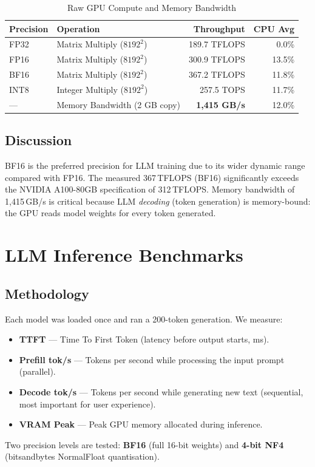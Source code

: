 \documentclass[11pt,a4paper]{article}
\begin{document}
\begin{table}[h!]
\centering
\caption{Raw GPU Compute and Memory Bandwidth}
\label{tab:raw}
\begin{tabular}{llrr}
\toprule
\textbf{Precision} & \textbf{Operation} & \textbf{Throughput} & \textbf{CPU Avg} \\
\midrule
FP32  & Matrix Multiply ($8192^2$) & 189.7 TFLOPS & 0.0\% \\
FP16  & Matrix Multiply ($8192^2$) & 300.9 TFLOPS & 13.5\% \\
BF16  & Matrix Multiply ($8192^2$) & 367.2 TFLOPS & 11.8\% \\
INT8  & Integer Multiply ($8192^2$) & 257.5 TOPS  & 11.7\% \\
\midrule
---   & Memory Bandwidth (2 GB copy) & \textbf{1{,}415 GB/s} & 12.0\% \\
\bottomrule
\end{tabular}
\end{table}

\subsection{Discussion}
BF16 is the preferred precision for LLM training due to its wider dynamic range
compared with FP16. The measured 367\,TFLOPS (BF16) significantly exceeds the
NVIDIA A100-80GB specification of 312\,TFLOPS. Memory bandwidth of 1{,}415\,GB/s
is critical because LLM \emph{decoding} (token generation) is memory-bound: the GPU
reads model weights for every token generated.

\section{LLM Inference Benchmarks}

\subsection{Methodology}
Each model was loaded once and ran a 200-token generation. We measure:
\begin{itemize}
  \item \textbf{TTFT} — Time To First Token (latency before output starts, ms).
  \item \textbf{Prefill tok/s} — Tokens per second while processing the input prompt (parallel).
  \item \textbf{Decode tok/s} — Tokens per second while generating new text (sequential, most important for user experience).
  \item \textbf{VRAM Peak} — Peak GPU memory allocated during inference.
\end{itemize}
Two precision levels are tested: \textbf{BF16} (full 16-bit weights) and
\textbf{4-bit NF4} (bitsandbytes NormalFloat quantisation).
\end{document}
